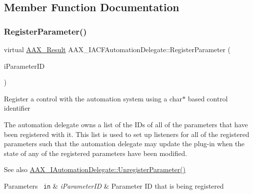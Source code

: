 \subsection{Member Function Documentation}
\mbox{\label{a01617_a2de166cf16da311514ab40b1871e4435}} 
\subsubsection{\texorpdfstring{RegisterParameter()}{RegisterParameter()}}
{\footnotesize\ttfamily virtual \mbox{\hyperlink{a00392_a4d8f69a697df7f70c3a8e9b8ee130d2f}{A\+A\+X\+\_\+\+Result}} A\+A\+X\+\_\+\+I\+A\+C\+F\+Automation\+Delegate\+::\+Register\+Parameter (\begin{DoxyParamCaption}\item[{\mbox{\hyperlink{a00392_a1440c756fe5cb158b78193b2fc1780d1}{A\+A\+X\+\_\+\+C\+Param\+ID}}}]{i\+Parameter\+ID }\end{DoxyParamCaption})\hspace{0.3cm}{\ttfamily [pure virtual]}}





Register a control with the automation system using a char$\ast$ based control identifier

The automation delegate owns a list of the I\+Ds of all of the parameters that have been registered with it. This list is used to set up listeners for all of the registered parameters such that the automation delegate may update the plug-\/in when the state of any of the registered parameters have been modified.

\begin{DoxySeeAlso}{See also}
\mbox{\hyperlink{a01773_ab1c1d4292460119b22d68247150cc1a0}{A\+A\+X\+\_\+\+I\+Automation\+Delegate\+::\+Unregister\+Parameter()}}
\end{DoxySeeAlso}

\begin{DoxyParams}[1]{Parameters}
\mbox{\texttt{ in}}  & {\em i\+Parameter\+ID} & Parameter ID that is being registered \\
\hline
\end{DoxyParams}
\mbox{\label{a01617_a5d1ff21e71cd04f717808da4b9f83d62}} 
